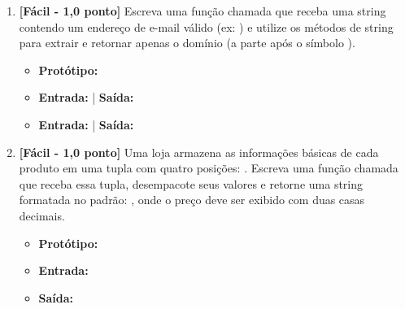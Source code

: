 \begin{enumerate}[label=\textbf{Q\arabic*.}, start=39]
\begin{itemize}[leftmargin=*]
    \item \textbf{Protótipo:}\newline {}
    \item \textbf{Entrada:}  | \textbf{Saída:} 
    \item \textbf{Entrada:}  | \textbf{Saída:} 
\end{itemize}



\vspace{0.4cm}

\item \textbf{[Fácil - 1,0 ponto]} Escreva uma função chamada  que receba uma string contendo um endereço de e-mail válido (ex: ) e utilize os métodos de string para extrair e retornar apenas o domínio (a parte após o símbolo ).

\begin{itemize}[leftmargin=*]
    \item \textbf{Protótipo:}\newline {}
    \item \textbf{Entrada:}  | \textbf{Saída:} 
    \item \textbf{Entrada:}  | \textbf{Saída:} 
\end{itemize}



\vspace{0.4cm}

\item \textbf{[Fácil - 1,0 ponto]} Uma loja armazena as informações básicas de cada produto em uma tupla com quatro posições: . Escreva uma função chamada  que receba essa tupla, desempacote seus valores e retorne uma string formatada no padrão: , onde o preço deve ser exibido com duas casas decimais.

\begin{itemize}[leftmargin=*]
    \item \textbf{Protótipo:}\newline {}\\
    \item \textbf{Entrada:} 
    \item \textbf{Saída:} 
\end{itemize}


\end{enumerate}
